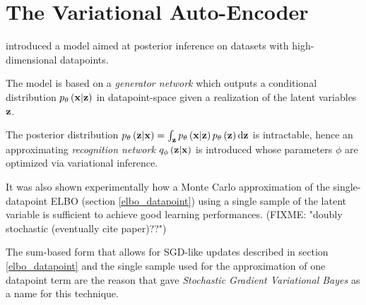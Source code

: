 \section{The Variational Auto-Encoder}

\cite{1312.6114} introduced a model aimed at posterior inference 
on datasets with high-dimensional datapoints.

The model is based on a \emph{generator network} which outputs a conditional
distribution $p_\theta\left(\mathbf{x}|\mathbf{z}\right)$ 
in datapoint-space given a realization of the latent variables $\mathbf{z}$.

The posterior distribution $p_\theta\left(\mathbf{z}|\mathbf{x}\right)=\int_{\mathbf{z}} p_\theta\left(\mathbf{x}|\mathbf{z}\right) p_\theta\left(\mathbf{z}\right) \mathrm{d}\mathbf{z}$ is intractable,
hence an approximating \emph{recognition network}
$q_\phi\left(\mathbf{z}|\mathbf{x}\right)$ is introduced whose parameters $\phi$ are
optimized via variational inference.

It was also shown experimentally how a Monte Carlo approximation of
the single-datapoint ELBO (section \ref{elbo_datapoint})
using a single sample of the latent variable is sufficient to
achieve good learning performances. (FIXME: "doubly stochastic (eventually cite paper)??")

The sum-based form that allows for SGD-like updates described in section
\ref{elbo_datapoint}
and
the single sample used for the approximation of one datapoint term
are the reason that \cite{1312.6114}
gave \emph{Stochastic Gradient Variational Bayes} as a name for this technique.
